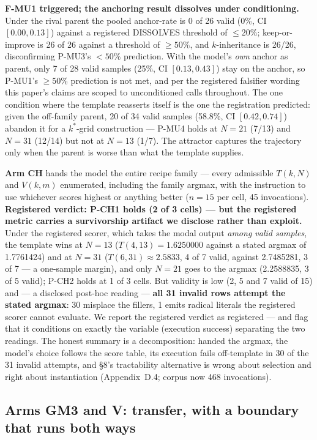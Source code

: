 \textbf{F-MU1 triggered; the anchoring result dissolves under conditioning.} Under the rival parent
the pooled anchor-rate is 0 of 26 valid (0\%, CI $[0.00, 0.13]$) against a registered DISSOLVES
threshold of $\le 20\%$; keep-or-improve is 26 of 26 against a threshold of $\ge 50\%$, and
$k$-inheritance is 26/26, disconfirming P-MU3's $< 50\%$ prediction. With the model's \emph{own}
anchor as parent, only 7 of 28 valid samples (25\%, CI $[0.13, 0.43]$) stay on the anchor, so
P-MU1's $\ge 50\%$ prediction is not met, and per the registered falsifier wording this paper's
claims are scoped to unconditioned calls throughout. The one condition where the template reasserts
itself is the one the registration predicted: given the off-family parent, 20 of 34 valid samples
(58.8\%, CI $[0.42, 0.74]$) abandon it for a $k^*$-grid construction --- P-MU4 holds at $N = 21$
(7/13) and $N = 31$ (12/14) but not at $N = 13$ (1/7). The attractor captures the trajectory only
when the parent is worse than what the template supplies.

\textbf{Arm CH} hands the model the entire recipe family --- every admissible $T(k, N)$ and
$V(k, m)$ enumerated, including the family argmax, with the instruction to use whichever scores
highest or anything better ($n = 15$ per cell, 45 invocations). \textbf{Registered verdict: P-CH1
holds (2 of 3 cells) --- but the registered metric carries a survivorship artifact we disclose
rather than exploit.} Under the registered scorer, which takes the modal output \emph{among valid
samples}, the template wins at $N = 13$ ($T(4,13) = 1.6250000$ against a stated argmax of 1.7761424)
and at $N = 31$ ($T(6,31) \approx 2.5833$, 4 of 7 valid, against 2.7485281, 3 of 7 --- a one-sample
margin), and only $N = 21$ goes to the argmax (2.2588835, 3 of 5 valid); P-CH2 holds at 1 of 3
cells. But validity is low (2, 5 and 7 valid of 15) and --- a disclosed post-hoc reading --- \textbf{all 31 invalid rows attempt the
stated argmax}: 30 misplace the fillers, 1 emits radical literals the registered scorer cannot
evaluate. We report the registered verdict as registered --- and flag that it conditions on exactly
the variable (execution success) separating the two readings. The honest summary is a
decomposition: handed the argmax, the model's choice follows the score table, its execution fails
off-template in 30 of the 31 invalid attempts, and \S8's tractability alternative is wrong about
selection and right about instantiation (Appendix~D.4; corpus now 468 invocations).

\subsection{Arms GM3 and V: transfer, with a boundary that runs both ways}

